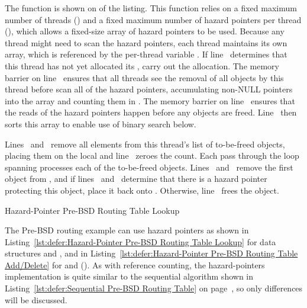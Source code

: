 \begin{fcvref}
The  function is shown on 
of the listing.
This function relies on a fixed maximum number of threads ()
and a fixed maximum number of hazard pointers per thread (),
which allows a fixed-size array of hazard pointers to be used.
Because any thread might need to scan the hazard pointers, each thread
maintains its own array, which is referenced by the per-thread variable
.
If line~ determines that this thread has not yet allocated its
,  carry out the allocation.
The memory barrier on line~ ensures that all threads see the
removal of all objects by this thread before
 scan
all of the hazard pointers, accumulating non-NULL pointers into
the  array and counting them in .
The memory barrier on line~ ensures that the reads of
the hazard pointers
happen before any objects are freed.
Line~ then sorts this array to enable use of binary search below.

Lines~ and~
remove all elements from this thread's list of
to-be-freed objects, placing them on the local 
and line~ zeroes the count.
Each pass through the loop spanning
 processes each
of the to-be-freed objects.
Lines~ and~
remove the first object from ,
and if lines~ and~
determine that there is a hazard pointer
protecting this object, 
place it back onto .
Otherwise, line~ frees the object.
\end{fcvref}

\begin{listing}

\caption{Hazard-Pointer Pre-BSD Routing Table Lookup}
\label{lst:defer:Hazard-Pointer Pre-BSD Routing Table Lookup}
\end{listing}

The Pre-BSD routing example can use hazard pointers as shown in
Listing~\ref{lst:defer:Hazard-Pointer Pre-BSD Routing Table Lookup}
for data structures and , and in
Listing~\ref{lst:defer:Hazard-Pointer Pre-BSD Routing Table Add/Delete}
for  and 
().
As with reference counting, the hazard-pointers implementation
is quite similar to the sequential algorithm shown in
Listing~\ref{lst:defer:Sequential Pre-BSD Routing Table}
on
page~\pageref{lst:defer:Sequential Pre-BSD Routing Table},
so only differences will be discussed.

